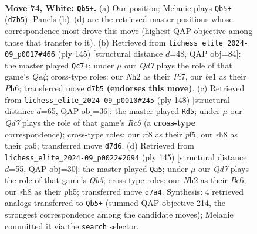\documentclass[11pt]{article}
\begin{document}
\clearpage

\begin{figure}[p]\centering
\begin{subfigure}{0.46\textwidth}\centering
\resizebox{\linewidth}{!}{%
\newchessgame
\chessboard[
  setfen={5r1r/pkqQ2p1/7p/3p3P/3P2P1/4P3/7N/4b2K w - - 3 74},
  showmover=false,
  pgfstyle=straightmove, color=movearrow, markmove={d7-b5}
]}
\caption{}
\end{subfigure}\hfill
\begin{subfigure}{0.46\textwidth}\centering
\resizebox{\linewidth}{!}{%
\newchessgame
\chessboard[
  setfen={6k1/5pp1/7p/2KQq3/p7/P5P1/1P3R1P/1b6 b - - 16 73},
  showmover=false,
  pgfstyle=straightmove, color=movearrow, markmove={e5-c7}
]}
\caption{}
\end{subfigure}
\\[4pt]
\begin{subfigure}{0.46\textwidth}\centering
\resizebox{\linewidth}{!}{%
\newchessgame
\chessboard[
  setfen={8/8/p2q1rkp/2R2p2/3Q2pP/6P1/6PK/8 w - - 69 75},
  showmover=false,
  pgfstyle=straightmove, color=movearrow, markmove={c5-d5}
]}
\caption{}
\end{subfigure}\hfill
\begin{subfigure}{0.46\textwidth}\centering
\resizebox{\linewidth}{!}{%
\newchessgame
\chessboard[
  setfen={8/6pk/2b1p3/1pP1P1pP/1q4P1/2R4K/3Q4/8 b - - 1 73},
  showmover=false,
  pgfstyle=straightmove, color=movearrow, markmove={b4-a5}
]}
\caption{}
\end{subfigure}
\caption{\textbf{Move 74, White: \texttt{Qb5+}.} (a) Our position; Melanie plays \texttt{Qb5+} (\texttt{d7b5}). Panels (b)--(d) are the retrieved master positions whose correspondence most drove this move (highest QAP objective among those that transfer to it). (b) Retrieved from \texttt{lichess\_elite\_2024-09\_p0017\#466} (ply 145) [structural distance $d$=48, QAP obj=84]: the master played \texttt{Qc7+}; under $\mu$ our \emph{Qd7} plays the role of that game's \emph{Qe4}; cross-type roles: our \emph{N}h2 as their \emph{P}f7, our \emph{b}e1 as their \emph{P}h6; transferred move \texttt{d7b5} \textbf{(endorses this move)}. (c) Retrieved from \texttt{lichess\_elite\_2024-09\_p0010\#245} (ply 148) [structural distance $d$=65, QAP obj=36]: the master played \texttt{Rd5}; under $\mu$ our \emph{Qd7} plays the role of that game's \emph{Rc5} (a \textbf{cross-type} correspondence); cross-type roles: our \emph{r}f8 as their \emph{p}f5, our \emph{r}h8 as their \emph{p}a6; transferred move \texttt{d7d6}. (d) Retrieved from \texttt{lichess\_elite\_2024-09\_p0022\#2694} (ply 145) [structural distance $d$=55, QAP obj=30]: the master played \texttt{Qa5}; under $\mu$ our \emph{Qd7} plays the role of that game's \emph{Qb5}; cross-type roles: our \emph{N}h2 as their \emph{B}c6, our \emph{r}h8 as their \emph{p}h5; transferred move \texttt{d7a4}. Synthesis: 4 retrieved analogs transferred to \texttt{Qb5+} (summed QAP objective 214, the strongest correspondence among the candidate moves); Melanie committed it via the \texttt{search} selector.}
\label{fig:thought-m146}
\end{figure}
\end{document}
